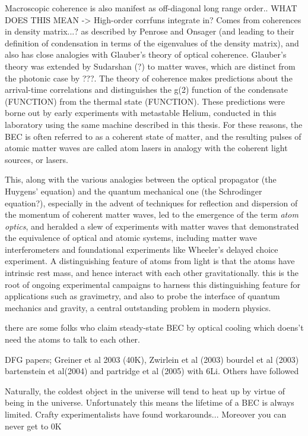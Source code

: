 	Macroscopic coherence is also manifest as off-diagonal long range order.. WHAT DOES THIS MEAN -> High-order corrfuns integrate in?
	Comes from coherences in density matrix...? as described by Penrose and Onsager (and leading	to their definition of condensation in terms of the eigenvalues of the	density matrix), and also has close analogies with Glauber's theory of	optical coherence.
	Glauber's theory was extended by Sudarshan (?) to	matter waves, which are distinct from the photonic case by ???.
	The	theory of coherence makes predictions about the arrival-time	correlations and distinguishes the g(2) function of the condensate	(FUNCTION) from the thermal state (FUNCTION).
	These predictions were	borne out by early experiments with metastable Helium, conducted in this	laboratory using the same machine described in this thesis.
	For these	reasons, the BEC is often referred to as a coherent state of matter, and	the resulting pulses of atomic matter waves are called atom lasers in	analogy with the coherent light sources, or lasers.

	This, along with the various analogies between the optical propagator	(the Huygens' equation) and the quantum mechanical one (the Schrodinger	equation?), especially in the advent of techniques for reflection and	dispersion of the momentum of coherent matter waves, led to the	emergence of the term \emph{atom optics}, and heralded a slew of	experiments with matter waves that demonstrated the equivalence of	optical and atomic systems, including matter wave interferometers and	foundational experiments like Wheeler's delayed choice experiment.
	A	distinguishing feature of atoms from light is that the atoms have	intrinsic rest mass, and hence interact with each other gravitationally.	this is the root of ongoing experimental campaigns to harness this	distinguishing feature for applications such as gravimetry, and also to	probe the interface of quantum mechanics and gravity, a central	outstanding problem in modern physics.

	there are some folks who claim steady-state BEC by optical cooling which doens't need the atoms to talk to each other.

	DFG papers; Greiner et al 2003 (40K), Zwirlein et al (2003) bourdel et al (2003) bartenstein et al(2004) and partridge et al (2005) with 6Li.
	Others have followed

	Naturally, the coldest object in the universe will tend to heat up by virtue of being in the universe.
	Unfortunately this means the lifetime of a BEC is always limited.
	Crafty experimentalists have found workarounds...
	Moreover you can never get to 0K

